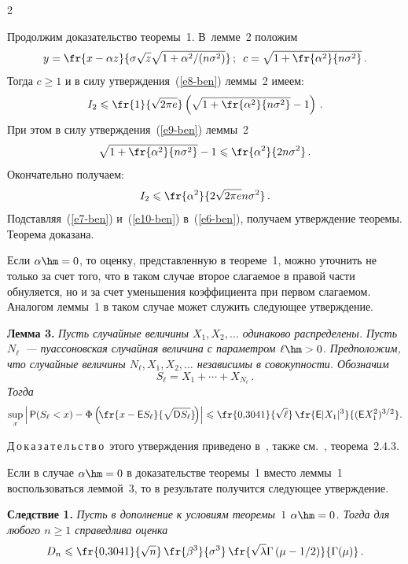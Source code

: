 \begin{multicols}{2}
\smallskip

Продолжим доказательство теоремы~1. В~лемме~2 положим
$$
y=\fr{x-\alpha z}{\sigma\sqrt{z}\sqrt{1+{\alpha^2}/({n\sigma^2})}}\,;\enskip
c=\sqrt{1+\fr{\alpha^2}{n\sigma^2}}\,.
$$
Тогда $c\geqslant1$ и в силу утверждения~(\ref{e8-ben}) леммы~2 имеем:
$$
I_2\leqslant\fr{1}{\sqrt{2\pi e}}\left(\sqrt{1+\fr{\alpha^2}{n\sigma^2}}-1\right)\,.
$$
При этом в силу утверждения~(\ref{e9-ben}) леммы~2
$$
\sqrt{1+\fr{\alpha^2}{n\sigma^2}}-1\leqslant\fr{\alpha^2}{2n\sigma^2}\,.
$$
Окончательно получаем:
\begin{equation}
I_2\leqslant\fr{\alpha^2}{2\sqrt{2\pi e}n\sigma^2}\,.\label{e10-ben}
\end{equation}
Подставляя~(\ref{e7-ben}) и~(\ref{e10-ben}) в~(\ref{e6-ben}), получаем утверждение теоремы. 
Теорема доказана.

\smallskip

Если $\alpha\hm=0$, то оценку, представленную в теореме~1, можно
уточнить не только за счет того, что в таком случае второе слагаемое
в правой части обнуляется, но и за счет уменьшения коэффициента при
первом слагаемом. Аналогом леммы~1 в таком случае может служить
следующее утверждение.

\smallskip

\noindent
\textbf{Лемма 3.} \textit{Пусть случайные величины $X_1,X_2,\ldots$
одинаково распределены. Пусть $N_{\ell}$~--- пуассоновская случайная
величина с параметром $\ell\hm>0$. Предположим, что случайные величины
$N_{\ell},X_1,X_2,\ldots$ независимы в совокупности. Обозначим
$$
S_{\ell}=X_1+\cdots+X_{N_{\ell}}\,.
$$
Тогда}
$$
\sup_x\left\vert\,{\sf P}(S_{\ell}<x)-\Phi\left(\!\fr{x-{\sf E}S_{\ell}}{\sqrt{{\sf D}S_{\ell}}}
\!\right)\right\vert\leqslant\fr{0{,}3041}{\sqrt{\ell}}\,
\fr{{\sf E}|X_1|^3}{({\sf E}X_1^2)^{3/2}}.
$$

\smallskip

\noindent
Д\,о\,к\,а\,з\,а\,т\,е\,л\,ь\,с\,т\,в\,о\ этого утверждения приведено 
в~\cite{KorolevShevtsova2010}, также см.~\cite{KorolevBeningShorgin2011}, теорема~2.4.3.

\smallskip

Если в случае $\alpha\hm=0$ в доказательстве теоремы~1 вместо леммы~1
воспользоваться леммой~3, то в результате получится следующее
утверждение.

\smallskip

\noindent
\textbf{Следствие 1.} \textit{Пусть в дополнение к условиям теоремы~$1$
$\alpha\hm=0$. Тогда для любого $n\geqslant1$ справедлива оценка}
$$
D_n\leqslant\fr{0{,}3041}{\sqrt{n}}\,
\fr{\beta^3}{\sigma^3}\,\fr{\sqrt{\lambda}\Gamma\left(\mu-{1}/{2}\right)}{\Gamma(\mu)}\,.
$$


\end{multicols}
